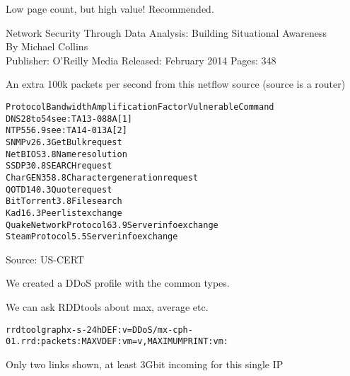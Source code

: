 \documentclass[20pt,landscape,a4paper,footrule]{foils}
\begin{document}


Low page count, but high value! Recommended.

Network Security Through Data Analysis: Building Situational Awareness\\
By Michael Collins\\
Publisher: O'Reilly Media
Released: February 2014 Pages: 348






\centerline{An extra 100k packets per second from this netflow source (source is a router)}



\begin{alltt}\small
Protocol   Bandwidth Amplification Factor        Vulnerable Command
DNS        28 to 54          see: TA13-088A [1]
NTP        556.9             see: TA14-013A [2]
SNMPv2       6.3             GetBulk request
NetBIOS      3.8             Name resolution
SSDP        30.8             SEARCH request
CharGEN    358.8             Character generation request
QOTD       140.3             Quote request
BitTorrent   3.8             File search
Kad         16.3             Peer list exchange
Quake Network Protocol 63.9  Server info exchange
Steam Protocol  5.5          Server info exchange
\end{alltt}

Source: US-CERT\\




We created a DDoS profile with the common types.

We can ask RDDtools about max, average etc.
\begin{alltt}\small
rrdtool graph x -s -24h DEF:v=DDoS/mx-cph-01.rrd:packets:MAX VDEF:vm=v,MAXIMUM PRINT:vm:%.lf
\end{alltt}





\centerline{Only two links shown, at least 3Gbit incoming for this single IP}
\end{document}
